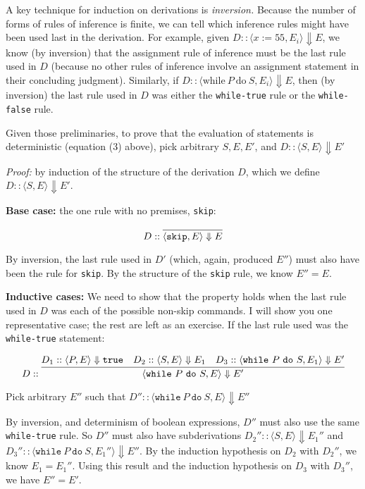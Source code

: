 \documentclass[11pt]{article}
\begin{document}
\vspace{1ex}
A key technique for induction on derivations is \emph{inversion.} Because the number
of forms of rules of inference is finite, we can tell which inference rules
might have been used last in the derivation. For example, given $D :: \langle x
:= 55, E_i \rangle \Downarrow E$, we know (by inversion) that the assignment rule of
inference must be the last rule used in $D$ (because no other rules of inference
involve an assignment statement in their concluding judgment). Similarly, if $D
:: \langle \mbox{while}~P~\mbox{do}~S, E_i \rangle \Downarrow E$, then (by inversion) the last
rule used in $D$ was either the \texttt{while-true} rule or the \texttt{while-false} rule.

Given those preliminaries, to prove that the evaluation of statements is
deterministic (equation (3) above), pick arbitrary $S, E, E'$, and $D :: \langle
S, E \rangle \Downarrow E'$

\vspace{1ex}
\noindent \emph{Proof:} by induction of the structure of the derivation $D$, which we define $D :: \langle S, E\rangle \Downarrow E'$. 

\vspace{1ex}
\noindent \textbf{Base case:} the one rule with no premises, \texttt{skip}:

\begin{equation*}
D :: \infer{\langle \mathtt{skip}, E \rangle \Downarrow E}{}
\end{equation*}

By inversion, the last rule used in $D'$ (which, again, produced $E''$) must also
have been the rule for \texttt{skip}.  By the structure of the \texttt{skip}
rule, we know $E'' = E$.

\vspace{1ex} 
\noindent\textbf{Inductive cases:} We need to show that the property holds when
the last rule used in $D$ was each of the possible non-skip \WhileLang commands.  I
will show you one representative case; the rest are left as an exercise.  If the
last rule used was the \texttt{while-true} statement:

\begin{equation*}
D :: 
\infer{\langle \mathtt{while}~P~\mathtt{do}~S, E \rangle \Downarrow E'}
{D_1 :: \langle P, E  \rangle \Downarrow \mathtt{true} & D_2 :: \langle S, E \rangle \Downarrow E_1 &
D_3 :: \langle \mathtt{while}~P~\mathtt{do}~S, E_1 \rangle \Downarrow E'}
\end{equation*}

\noindent Pick arbitrary $E''$ such that $D'' :: \langle \mathtt{while}~P~\mathtt{do}~S, E \rangle \Downarrow E''$

By inversion, and determinism of boolean expressions, $D''$ must also use
the same \texttt{while-true} rule.  So $D''$ must also have subderivations $D_2'' ::
\langle S, E \rangle \Downarrow E_1''$ and $D_3'' :: \langle \mathtt{while}~P~\mathtt{do}~S, E_1 ''
\rangle \Downarrow E''$.  By the induction hypothesis on $D_2$ with $D_2''$, we know
$E_1 = E_1''$.  Using this result and the induction hypothesis on $D_3$ with $D_3''$,
we have $E''= E'$.
\end{document}
